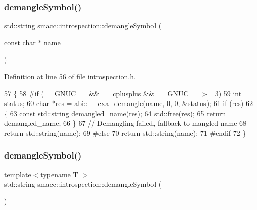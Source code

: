 \subsubsection{\texorpdfstring{demangle\+Symbol()}{demangleSymbol()}\hspace{0.1cm}{\footnotesize\ttfamily [2/3]}}
{\footnotesize\ttfamily std\+::string smacc\+::introspection\+::demangle\+Symbol (\begin{DoxyParamCaption}\item[{const char $\ast$}]{name }\end{DoxyParamCaption})\hspace{0.3cm}{\ttfamily [inline]}}



Definition at line 56 of file introspection.\+h.


\begin{DoxyCode}
57 \{
58 \textcolor{preprocessor}{#if (\_\_GNUC\_\_ && \_\_cplusplus && \_\_GNUC\_\_ >= 3)}
59     \textcolor{keywordtype}{int} status;
60     \textcolor{keywordtype}{char} *res = abi::\_\_cxa\_demangle(name, 0, 0, &status);
61     \textcolor{keywordflow}{if} (res)
62     \{
63         \textcolor{keyword}{const} std::string demangled\_name(res);
64         std::free(res);
65         \textcolor{keywordflow}{return} demangled\_name;
66     \}
67     \textcolor{comment}{// Demangling failed, fallback to mangled name}
68     \textcolor{keywordflow}{return} std::string(name);
69 \textcolor{preprocessor}{#else}
70     \textcolor{keywordflow}{return} std::string(name);
71 \textcolor{preprocessor}{#endif}
72 \}
\end{DoxyCode}
\mbox{\label{namespacesmacc_1_1introspection_aa9158a0ff0cfe83a59877e6af7d7f873}} 
\subsubsection{\texorpdfstring{demangle\+Symbol()}{demangleSymbol()}\hspace{0.1cm}{\footnotesize\ttfamily [3/3]}}
{\footnotesize\ttfamily template$<$typename T $>$ \\
std\+::string smacc\+::introspection\+::demangle\+Symbol (\begin{DoxyParamCaption}{ }\end{DoxyParamCaption})\hspace{0.3cm}{\ttfamily [inline]}}



